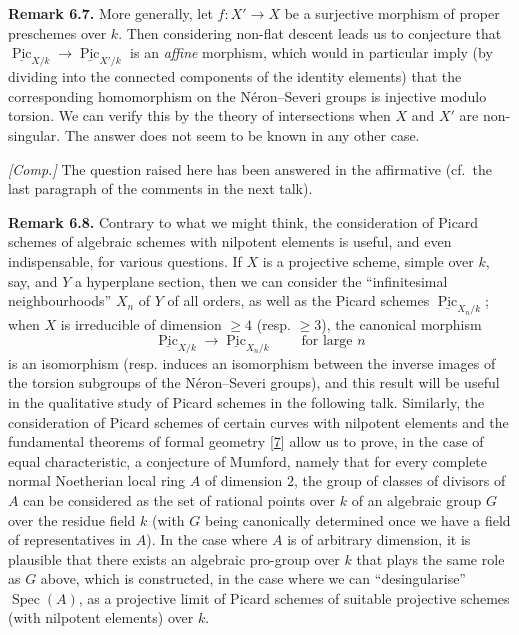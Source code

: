 \documentclass{article}
\newenvironment{rmenv}[1]
  {\phantomsection\par\smallskip\noindent\textbf{#1.}\rmfamily}
  {\par\smallskip}
\newcommand{\oldpage}[1]{\marginpar{\footnotesize$\Big\vert$ \textit{p.~#1}}}
\theoremstyle{definition}
\theoremstyle{definition}
\theoremstyle{definition}
\theoremstyle{definition}
\theoremstyle{remark}
\begin{document}
\leavevmode{}%
\begin{rmenv}{Remark 6.7}
More generally, let \(f\colon X'\to X\) be a surjective morphism of proper preschemes over \(k\).
Then considering non-flat descent leads us to conjecture that \(\underline{\operatorname{Pic}}_{X/k}\to\underline{\operatorname{Pic}}_{X'/k}\) is an \emph{affine} morphism, which would in particular imply (by dividing into the connected components of the identity elements) that the corresponding homomorphism on the Néron--Severi groups is injective modulo torsion.
We can verify this by the theory of intersections when \(X\) and \(X'\) are non-singular.
The answer does not seem to be known in any other case.

\emph{{[}Comp.{]}}
The question raised here has been answered in the affirmative (cf.~the last paragraph of the comments in the next talk).

\end{rmenv}

\leavevmode{}%
\begin{rmenv}{Remark 6.8}
Contrary to what we might think, the consideration of Picard schemes of algebraic schemes with nilpotent elements is useful, and even indispensable, for various questions.
If \(X\) is a projective scheme, simple over \(k\), say, and \(Y\) a hyperplane section, then we can consider the ``infinitesimal neighbourhoods'' \(X_n\) of \(Y\) of all orders, as well as the Picard schemes \(\underline{\operatorname{Pic}}_{X_n/k}\);
when \(X\) is irreducible of dimension \(\geqslant 4\) (resp. \(\geqslant 3\)), the canonical morphism
\[
  \underline{\operatorname{Pic}}_{X/k}
  \to\underline{\operatorname{Pic}}_{X_n/k}
  \qquad\text{for large }n
\]
is an isomorphism (resp. induces an isomorphism between the inverse images of the torsion subgroups of the Néron--Severi groups), and this result will be useful in the qualitative study of Picard schemes in the following talk.
Similarly, the consideration of Picard schemes of certain curves with nilpotent elements and the fundamental theorems of formal geometry {[}\protect\hyperlink{ref-Gro1958a}{7}{]} allow us to prove, in the case of equal characteristic, a conjecture of Mumford, namely that for every complete normal Noetherian local ring \(A\) of dimension \(2\), the group of classes of divisors of \(A\) can be considered as the set of rational points over \(k\) of an algebraic group \(G\) over the residue field \(k\) (with \(G\) being canonically determined once we have a field of representatives in \(A\)).
\oldpage{232-19}In the case where \(A\) is of arbitrary dimension, it is plausible that there exists an algebraic pro-group over \(k\) that plays the same role as \(G\) above, which is constructed, in the case where we can ``desingularise'' \(\operatorname{Spec}(A)\), as a projective limit of Picard schemes of suitable projective schemes (with nilpotent elements) over \(k\).

\end{rmenv}
\end{document}
